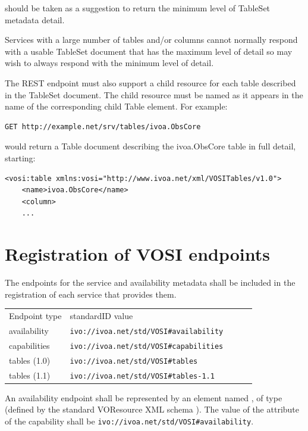 \documentclass[11pt,letter]{ivoa}
\begin{document}
should be taken as a suggestion to return the minimum level of TableSet metadata detail.

Services with a large number of tables and/or columns cannot normally respond with a usable TableSet document that has the maximum level of detail so may wish to always respond with the minimum level of detail.

The REST endpoint must also support a child resource for each table described in the TableSet document.  The child resource must be named as it appears in the name of the corresponding child Table element.  For example:

\begin{verbatim}
GET http://example.net/srv/tables/ivoa.ObsCore
\end{verbatim}

would return a Table document describing the ivoa.ObsCore table in full detail, starting:

\begin{verbatim}
<vosi:table xmlns:vosi="http://www.ivoa.net/xml/VOSITables/v1.0">
    <name>ivoa.ObsCore</name>
    <column>
    ...
\end{verbatim} 

\section{Registration of VOSI endpoints}
\label{sec:endpoints}

The endpoints for the service and availability metadata shall be included in the registration of each service that provides them.

\begin{tabular}{l l l l l}
\label{tab:registration}
Endpoint type & standardID value \\
availability & \nolinkurl{ivo://ivoa.net/std/VOSI#availability} \\
capabilities & \nolinkurl{ivo://ivoa.net/std/VOSI#capabilities} \\
tables (1.0) & \nolinkurl{ivo://ivoa.net/std/VOSI#tables} \\
tables (1.1) & \nolinkurl{ivo://ivoa.net/std/VOSI#tables-1.1} \\
\end{tabular}

An availability endpoint shall be represented by an element named , of type  (defined by the standard VOResource XML schema \citet{std:VOR}). The value of the  attribute of the capability shall be \nolinkurl{ivo://ivoa.net/std/VOSI#availability}.
\end{document}
